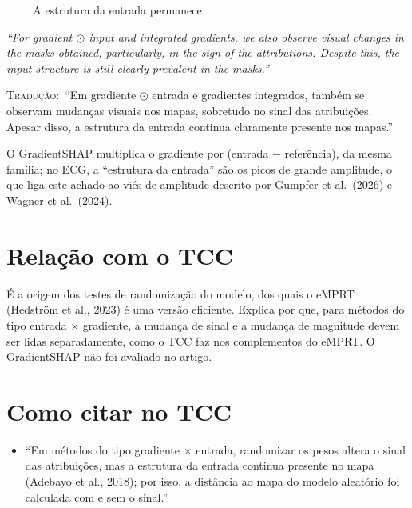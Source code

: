 \documentclass[11pt,a4paper]{article}
\newcommand{\pagechip}[1]{{\setlength{\fboxsep}{1.5pt}\colorbox{cAcc}{\textcolor{white}{\scriptsize\texttt{#1}}}}}
\newenvironment{origquote}{\par\itshape\small}{\par}
\newenvironment{tradquote}{\par\small\textsc{Tradução:}\ }{\par}
\newcommand{\explab}[1]{\par\smallskip{\small\color{cAcc}\textbf{\MakeUppercase{#1}}}\par}
\begin{document}
\begin{citacard}{\pagechip{p. 7} A estrutura da entrada permanece}
\begin{origquote}“For gradient $\odot$ input and integrated gradients, we also observe visual changes in the masks obtained, particularly, in the sign of the attributions. Despite this, the input structure is still clearly prevalent in the masks.”\end{origquote}
\begin{tradquote}“Em gradiente $\odot$ entrada e gradientes integrados, também se observam mudanças visuais nos mapas, sobretudo no sinal das atribuições. Apesar disso, a estrutura da entrada continua claramente presente nos mapas.”\end{tradquote}
\explab{Explicação}
O GradientSHAP multiplica o gradiente por (entrada $-$ referência), da mesma família; no ECG, a ``estrutura da entrada'' são os picos de grande amplitude, o que liga este achado ao viés de amplitude descrito por Gumpfer et al.\ (2026) e Wagner et al.\ (2024).
\end{citacard}

\section{Relação com o TCC}
É a origem dos testes de randomização do modelo, dos quais o eMPRT (Hedström et al., 2023) é uma versão eficiente. Explica por que, para métodos do tipo entrada $\times$ gradiente, a mudança de sinal e a mudança de magnitude devem ser lidas separadamente, como o TCC faz nos complementos do eMPRT. O GradientSHAP não foi avaliado no artigo.

\section{Como citar no TCC}
\begin{itemize}
\item ``Em métodos do tipo gradiente $\times$ entrada, randomizar os pesos altera o sinal das atribuições, mas a estrutura da entrada continua presente no mapa (Adebayo et al., 2018); por isso, a distância ao mapa do modelo aleatório foi calculada com e sem o sinal.''
\end{itemize}
\end{document}
